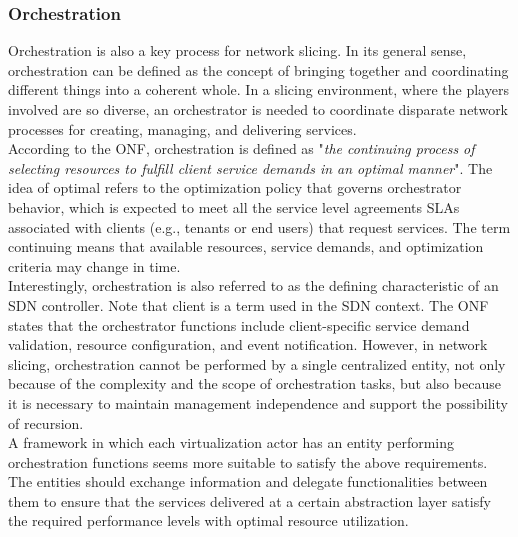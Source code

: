 \documentclass{report}
\begin{document}
\subsubsection{Orchestration}
Orchestration is also a key process for network
slicing. In its general sense, orchestration can be
defined as the concept of bringing together and coordinating different things into a coherent whole.
In a slicing environment, where the players involved
are so diverse, an orchestrator is needed to coordinate disparate network processes for
creating, managing, and delivering services.\\
According to the \gls{ONF},
orchestration is defined as "\textit{the continuing process of
selecting resources to fulfill client service demands
in an optimal manner}". The idea of optimal refers
to the optimization policy that governs orchestrator behavior, which is expected to meet all the service level agreements \gls{SLA}s associated with clients (e.g., tenants or end users)
that request services. The term continuing means
that available resources, service demands, and optimization criteria may change in time. \\
Interestingly, orchestration is also referred to as the defining
characteristic of an SDN controller. Note that client
is a term used in the SDN context.
The ONF states that the orchestrator functions
include client-specific service demand validation,
resource configuration, and event notification.
However, in network slicing, orchestration cannot be performed by a single centralized entity,
not only because of the complexity and the
scope of orchestration tasks, but also because it
is necessary to maintain management independence and support the possibility of recursion. \\
A framework in which each virtualization
actor has an entity performing orchestration functions seems more suitable to satisfy the
above requirements. The entities should exchange
information and delegate functionalities between
them to ensure that the services delivered at a
certain abstraction layer satisfy the required performance levels with optimal resource utilization.
\end{document}
